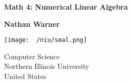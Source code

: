 \documentclass{report}
\title{\Huge{}}
\author{\huge{Nathan Warner}}
\date{\huge{}}
\begin{document}
        \begin{titlepage}
       \begin{center}
           \vspace*{1cm}
    
           \textbf{Math 4: Numerical Linear Algebra}
    
           \vspace{0.5cm}
            
                
           \vspace{1.5cm}
    
           \textbf{Nathan Warner}
    
           \vfill
                
                
           \vspace{0.8cm}
         
           \texttt{[image: ~/niu/seal.png]}
                
           Computer Science \\
           Northern Illinois University\\
           United States\\
           
                
       \end{center}
    \end{titlepage}
    \tableofcontents
    \pagebreak 
    \bigbreak \noindent 
\end{document}
